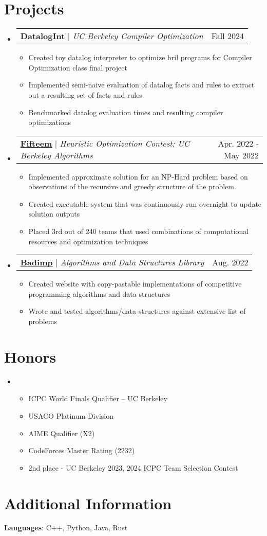 \documentclass[letterpaper,11pt]{article}
\makeatletter
\newcommand{\resumeItem}[1]{
  \item\small{
    {#1 \vspace{-2pt}}
  }
}
\newcommand{\resumeProjectHeading}[2]{
    \item
    \begin{tabular*}{0.97\textwidth}{l@{\extracolsep{\fill}}r}
      \small#1 & #2 \\
    \end{tabular*}\vspace{-7pt}
}
\newcommand{\resumeSubHeadingListStart}{\begin{itemize}[leftmargin=0.15in, label={}]}
\newcommand{\resumeSubHeadingListEnd}{\end{itemize}}
\newcommand{\resumeItemListStart}{\begin{itemize}}
\newcommand{\resumeItemListEnd}{\end{itemize}\vspace{-5pt}}
\makeatother
\begin{document}
\section{Projects}
\resumeSubHeadingListStart
\resumeProjectHeading
{\textbf{DatalogInt} $|$ \emph{UC Berkeley Compiler Optimization}}{Fall 2024}
\resumeItemListStart
\resumeItem{Created toy datalog interpreter to optimize bril programs for Compiler Optimization class final project}
\resumeItem{Implemented semi-naive evaluation of datalog facts and rules to extract out a resulting set of facts and rules}
\resumeItem{Benchmarked datalog evaluation times and resulting compiler optimizations}
\resumeItemListEnd
\resumeProjectHeading
{\href{https://github.com/ernest-lu/Fifteem/blob/main/projectreflection.pdf}{\underline{\textbf{Fifteem}}} $|$ \emph{Heuristic Optimization Contest; UC Berkeley Algorithms}}{Apr. 2022 - May 2022}
\resumeItemListStart
\resumeItem{Implemented approximate solution for an NP-Hard problem based on observations of the recursive and greedy structure of the problem.}
\resumeItem{Created executable system that was continuously run overnight to update solution outputs}
\resumeItem{Placed 3rd out of 240 teams that used combinations of computational resources and optimization techniques}
\resumeItemListEnd
\resumeProjectHeading
{\href{https://badimp.vercel.app/}{\underline{\textbf{Badimp}}} $|$ \emph{Algorithms and Data Structures Library}}{Aug. 2022}
\resumeItemListStart
\resumeItem{Created website with copy-pastable implementations of competitive programming algorithms and data structures}
\resumeItem{Wrote and tested algorithms/data structures against extensive list of problems}
\resumeItemListEnd
\resumeSubHeadingListEnd

\section{Honors}
\resumeSubHeadingListStart
\item{}
\resumeItemListStart
\resumeItem{ICPC World Finals Qualifier – UC Berkeley}
\resumeItem{USACO Platinum Division}
\resumeItem{AIME Qualifier (X2)}
\resumeItem{CodeForces Master Rating (2232)}
\resumeItem{2nd place - UC Berkeley 2023, 2024 ICPC Team Selection Contest}
\resumeItemListEnd
\resumeSubHeadingListEnd


%
\section{Additional Information}
\begin{itemize}[leftmargin=0.15in, label={}]
  \small{\item{
                \textbf{Languages}{: C++, Python, Java, Rust} \\
          }}
\end{itemize}


\end{document}
